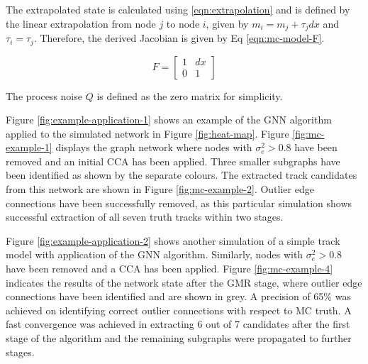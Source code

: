 The extrapolated state is calculated using \eqref{eqn:extrapolation} and is defined by the linear extrapolation from node $j$ to node $i$, given by $m_i = m_j + \tau_j dx$ and $\tau_i = \tau_j$. Therefore, the derived Jacobian is given by Eq \eqref{eqn:mc-model-F}.

\begin{equation}
F = \begin{bmatrix} 1 & dx \\ 0 & 1 \end{bmatrix}
\label{eqn:mc-model-F}
\end{equation}

The process noise $Q$ is defined as the zero matrix for simplicity.


Figure \ref{fig:example-application-1} shows an example of the GNN algorithm applied to the simulated network in Figure \ref{fig:heat-map}. Figure \ref{fig:mc-example-1} displays the graph network where nodes with $\sigma_e^2 > 0.8$ have been removed and an initial CCA has been applied. Three smaller subgraphs have been identified as shown by the separate colours. The extracted track candidates from this network are shown in Figure \ref{fig:mc-example-2}. Outlier edge connections have been successfully removed, as this particular simulation shows successful extraction of all seven truth tracks within two stages.


Figure \ref{fig:example-application-2} shows another simulation of a simple track model with application of the GNN algorithm. Similarly, nodes with $\sigma_e^2 > 0.8$ have been removed and a CCA has been applied. Figure \ref{fig:mc-example-4} indicates the results of the network state after the GMR stage, where outlier edge connections have been identified and are shown in grey. A precision of 65\% was achieved on identifying correct outlier connections with respect to MC truth. A fast convergence was achieved in extracting 6 out of 7 candidates after the first stage of the algorithm and the remaining subgraphs were propagated to further stages. 



